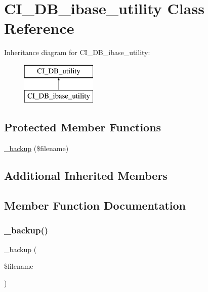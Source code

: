 \hypertarget{class_c_i___d_b__ibase__utility}{}\section{C\+I\+\_\+\+D\+B\+\_\+ibase\+\_\+utility Class Reference}
\label{class_c_i___d_b__ibase__utility}
Inheritance diagram for C\+I\+\_\+\+D\+B\+\_\+ibase\+\_\+utility\+:\begin{figure}[H]
\begin{center}
\leavevmode
\includegraphics[height=2.000000cm]{class_c_i___d_b__ibase__utility}
\end{center}
\end{figure}
\subsection*{Protected Member Functions}
\begin{DoxyCompactItemize}
\item 
\mbox{\hyperlink{class_c_i___d_b__ibase__utility_a25acdcc54da34a10f507e2abd93feca1}{\+\_\+backup}} (\$filename)
\end{DoxyCompactItemize}
\subsection*{Additional Inherited Members}


\subsection{Member Function Documentation}
\mbox{\label{class_c_i___d_b__ibase__utility_a25acdcc54da34a10f507e2abd93feca1}} 
\subsubsection{\texorpdfstring{\+\_\+backup()}{\_backup()}}
{\footnotesize\ttfamily \+\_\+backup (\begin{DoxyParamCaption}\item[{}]{\$filename }\end{DoxyParamCaption})\hspace{0.3cm}{\ttfamily [protected]}}

